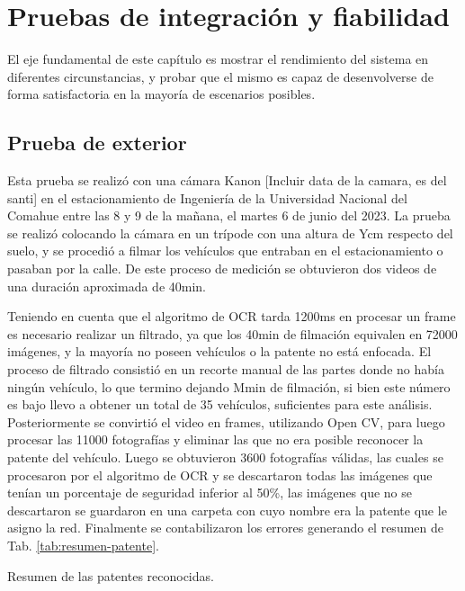 \chapter{Pruebas de integración y fiabilidad}

El eje fundamental de este capítulo es mostrar el rendimiento del sistema en diferentes circunstancias, y probar que el mismo es capaz de desenvolverse de forma satisfactoria en la mayoría de escenarios posibles.

\section{Prueba de exterior}

Esta prueba se realizó con una cámara Kanon [Incluir data de la camara, es del santi] en el estacionamiento de Ingeniería de la Universidad Nacional del Comahue entre las 8 y 9 de la mañana, el martes 6 de junio del 2023. La prueba se realizó colocando la cámara en un trípode con una altura de Ycm respecto del suelo, y se procedió a filmar los vehículos que entraban en el estacionamiento o pasaban por la calle. De este proceso de medición se obtuvieron dos videos de una duración aproximada de 40min.

Teniendo en cuenta que el algoritmo de OCR tarda 1200ms en procesar un frame es necesario realizar un filtrado, ya que los 40min de filmación equivalen en 72000 imágenes, y la mayoría no poseen vehículos o la patente no está enfocada. El proceso de filtrado consistió en un recorte manual de las partes donde no había ningún vehículo, lo que termino dejando Mmin de filmación, si bien este número es bajo llevo a obtener un total de 35 vehículos, suficientes para este análisis. Posteriormente se convirtió el video en frames, utilizando Open CV, para luego procesar las 11000 fotografías y eliminar las que no era posible reconocer la patente del vehículo. Luego se obtuvieron 3600 fotografías válidas, las cuales se procesaron por el algoritmo de OCR y se descartaron todas las imágenes que tenían un porcentaje de seguridad inferior al 50\%, las imágenes que no se descartaron se guardaron en una carpeta con cuyo nombre era la patente que le asigno la red.
Finalmente se contabilizaron los errores generando el resumen de Tab. \ref{tab:resumen-patente}.

\begin{table}
    \centering
    
    \caption{Resumen de las patentes reconocidas.}
    \label{tab:resumen-patente}
\end{table}


